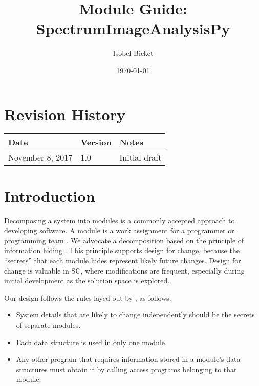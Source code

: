 \documentclass[12pt, titlepage]{article}
\newcommand{\progname}{SpectrumImageAnalysisPy}
\begin{document}

\title{Module Guide: \progname} 
\author{Isobel Bicket}
\date{\today}

\maketitle


\section{Revision History}

\begin{tabularx}{\textwidth}{p{4cm}p{2cm}X}
\toprule {\bf Date} & {\bf Version} & {\bf Notes}\\
\midrule
November 8, 2017 & 1.0 & Initial draft\\
\bottomrule
\end{tabularx}

\newpage

\tableofcontents

\listoftables

\listoffigures

\newpage


\section{Introduction}

Decomposing a system into modules is a commonly accepted approach to developing
software.  A module is a work assignment for a programmer or programming
team \cite{parnas_modular_1985}.  We advocate a decomposition
based on the principle of information hiding \cite{Parnas1972a}.  This
principle supports design for change, because the ``secrets'' that each module
hides represent likely future changes.  Design for change is valuable in SC,
where modifications are frequent, especially during initial development as the
solution space is explored.  

Our design follows the rules layed out by \cite{parnas_modular_1985}, as
follows:
\begin{itemize}
\item System details that are likely to change independently should be the
  secrets of separate modules.
\item Each data structure is used in only one module.
\item Any other program that requires information stored in a module's data
  structures must obtain it by calling access programs belonging to that module.
\end{itemize}
\end{document}
